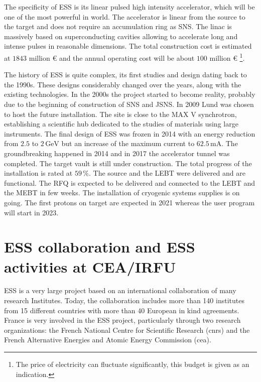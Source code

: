 \begin{refsection}
  The specificity of ESS is its linear pulsed high intensity accelerator, which will be one of the most powerful in world. The accelerator is linear from the source to the target and does not require an accumulation ring as SNS. The linac is massively based on superconducting cavities allowing to accelerate long and intense pulses in reasonable dimensions. The total construction cost is estimated at $1843$ million € and the annual operating cost will be about $100$ million € \footnote{The price of electricity can fluctuate significantly, this budget is given as an indication.}.


  The history of ESS is quite complex, its first studies and design dating back to the 1990s. These designs considerably changed over the years, along with the existing technologies.
  In the 2000s the project started to become reality, probably due to the beginning of construction of SNS and JSNS.
  In 2009 Lund was chosen to host the future installation. The site is close to the MAX V synchrotron, establishing a scientific hub dedicated to the studies of materials using large instruments.
  The final design of ESS was frozen in 2014 with an energy reduction from $2.5$ to $2\,\mathrm{GeV}$ but an increase of the maximum current to $62.5\,\mathrm{mA}$. The groundbreaking happened in 2014 and in 2017 the accelerator tunnel was completed. The target vault is still under construction. The total progress of the installation is rated at $59\,\mathrm{\%}$. The source and the LEBT were delivered and are functional. The RFQ is expected to be delivered and connected to the LEBT and the MEBT in few weeks. The installation of cryogenic systems supplies is on going. The first protons on target are expected in 2021 whereas the user program will start in 2023.

  \section{ESS collaboration and ESS activities at CEA/IRFU}

  ESS is a very large project based on an international collaboration of many research Institutes. Today, the collaboration includes more than 140 institutes from 15 different countries with more than 40 European in kind agreements. France is very involved in the ESS project, particularly through two research organizations: the French National Centre for Scientific Research (\acrshort{cnrs}) and the French Alternative Energies and Atomic Energy Commission (\acrshort{cea}).


\end{refsection}
